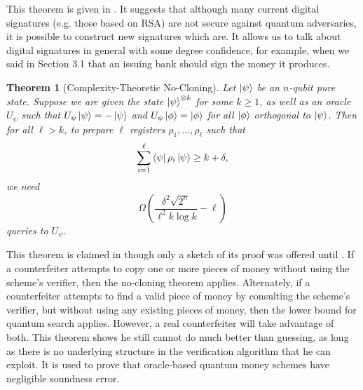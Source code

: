 \documentclass[12pt]{article}
\newtheorem{theorem}{Theorem}
\begin{document}
This theorem is given in \cite{Aar13}.  It suggests that although many current digital signatures (e.g. those based on RSA) are not secure against quantum adversaries, it is possible to construct new signatures which are.  It allows us to talk about digital signatures in general with some degree confidence, for example, when we said in Section 3.1 that an issuing bank should sign the money it produces.

\begin{theorem}[Complexity-Theoretic No-Cloning]
Let $\Ket{\psi}$ be an $n$-qubit pure state.  Suppose we are given the state $\Ket{\psi}^{\otimes k}$ for some $k \geq 1$, as well as an oracle $U_\psi$ such that $U_\psi\Ket{\psi} = -\Ket{\psi}$ and $U_\psi\Ket{\phi} = \Ket{\phi}$ for all $\Ket{\phi}$ orthogonal to $\Ket{\psi}$.  Then for all $\ell > k$, to prepare $\ell$ registers $\rho_1,...,\rho_\ell$ such that $$\sum_{i=1}^\ell\Bra{\psi}\rho_i\Ket{\psi} \geq k + \delta,$$ we need $$\Omega\left(\frac{\delta^2\sqrt{2^n}}{\ell^2k\log{k}} - \ell\right)$$ queries to $U_\psi$.
\end{theorem}

This theorem is claimed in \cite{Aar09} though only a sketch of its proof was offered until \cite{Aar13}.  If a counterfeiter attempts to copy one or more pieces of money without using the scheme's verifier, then the no-cloning theorem applies.  Alternately, if a counterfeiter attempts to find a valid piece of money by consulting the scheme's verifier, but without using any existing pieces of money, then the lower bound for quantum search applies.  However, a real counterfeiter will take advantage of both.  This theorem shows he still cannot do much better than guessing, as long as there is no underlying structure in the verification algorithm that he can exploit.  It is used to prove that oracle-based quantum money schemes have negligible soundness error.
\end{document}
